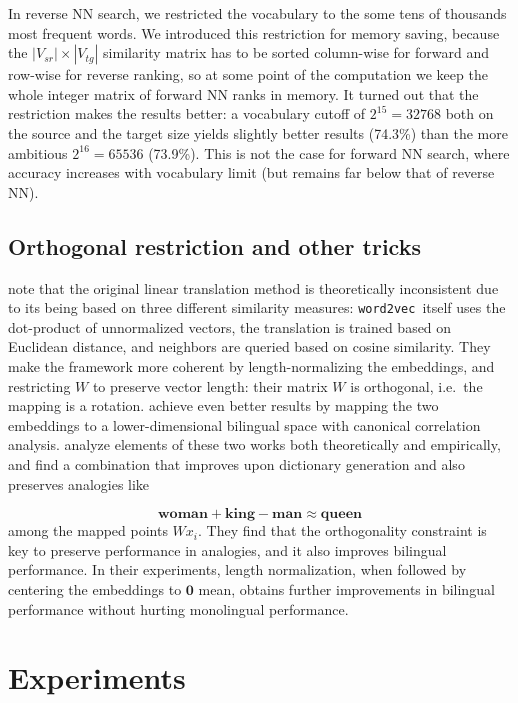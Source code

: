 \documentclass[11pt]{article}
\begin{document}
In reverse NN search, we restricted the vocabulary to the some tens of
thousands most frequent words. We introduced this restriction for memory
saving, because the $|V_{sr}|\times|V_{tg}|$ similarity matrix has
to be sorted column-wise for forward and row-wise for reverse ranking, so at
some point of the computation we keep the whole integer matrix of forward NN
ranks in memory. It turned out that the restriction makes the results better: a
vocabulary cutoff of $2^{15}=32768$ both on the source and the target size
yields slightly better results (74.3\%) than the more ambitious $2^{16}=65536$
(73.9\%). This is not the case for forward NN search, where accuracy increases
with vocabulary limit (but remains far below that of reverse NN).

\subsection{Orthogonal restriction and other tricks}

\newcommand{\wordtovec}{\texttt{word2vec}}

\cite{Xing:2015} note that the original linear translation method is
theoretically inconsistent due to its being based on three different similarity measures:
\wordtovec~itself uses the dot-product of unnormalized vectors, the translation
is trained based on Euclidean distance, and neighbors are queried based on
cosine similarity. They make the framework more coherent by length-normalizing
the embeddings, and restricting $W$ to preserve vector length: their matrix
$W$ is orthogonal, i.e.~the mapping is a rotation.  \cite{Faruqui:2014} achieve
even better results by mapping the two embeddings to a lower-dimensional
bilingual space with canonical correlation analysis.  \cite{Artetxe:2016}
analyze elements of these two works both theoretically and empirically, and
find a combination that improves upon dictionary generation and also preserves
analogies \citep{Mikolov:2013l} like

\[\mathbf{woman} + \mathbf{king}- \mathbf{man}  \approx \mathbf{queen}\]
among the mapped points $Wx_i$. They find that the
orthogonality constraint is key to preserve performance in analogies, and it
also improves bilingual performance.  In their experiments, length
normalization, when followed by centering the embeddings to $\mathbf 0$ mean,
obtains further improvements in bilingual performance without hurting
monolingual performance.

\section{Experiments}
\label{sec:exper}
\end{document}
